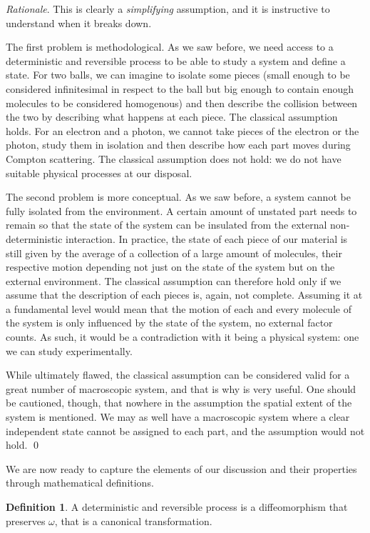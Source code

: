 \documentclass[aps,pra,10pt,twocolumn,floatfix,nofootinbib]{revtex4-1}
\theoremstyle{definition}
\newtheorem{defn}[prop]{Definition}
\newenvironment{rationale}{\emph{Rationale}.}{\qed}
\begin{document}
\begin{rationale}
	This is clearly a \emph{simplifying} assumption, and it is instructive to understand when it breaks down.
	
	The first problem is methodological. As we saw before, we need access to a deterministic and reversible process to be able to study a system and define a state. For two balls, we can imagine to isolate some pieces (small enough to be considered infinitesimal in respect to the ball but big enough to contain enough molecules to be considered homogenous) and then describe the collision between the two by describing what happens at each piece. The classical assumption holds. For an electron and a photon, we cannot take pieces of the electron or the photon, study them in isolation and then describe how each part moves during Compton scattering. The classical assumption does not hold: we do not have suitable physical processes at our disposal.
	
	The second problem is more conceptual. As we saw before, a system cannot be fully isolated from the environment. A certain amount of unstated part needs to remain so that the state of the system can be insulated from the external non-deterministic interaction. In practice, the state of each piece of our material is still given by the average of a collection of a large amount of molecules, their respective motion depending not just on the state of the system but on the external environment.  The classical assumption can therefore hold only if we assume that the description of each pieces is, again, not complete. Assuming it at a fundamental level would mean that the motion of each and every molecule of the system is only influenced by the state of the system, no external factor counts. As such, it would be a contradiction with it being a physical system: one we can study experimentally.
	
	While ultimately flawed, the classical assumption can be considered valid for a great number of macroscopic system, and that is why is very useful. One should be cautioned, though, that nowhere in the assumption the spatial extent of the system is mentioned. We may as well have a macroscopic system where a clear independent state cannot be assigned to each part, and the assumption would not hold.
\end{rationale}

We are now ready to capture the elements of our discussion and their properties through mathematical definitions.


\begin{defn}\label{canonical_transformation}
	A deterministic and reversible process is a diffeomorphism that preserves $\omega$, that is a canonical transformation.
\end{defn}
\end{document}
